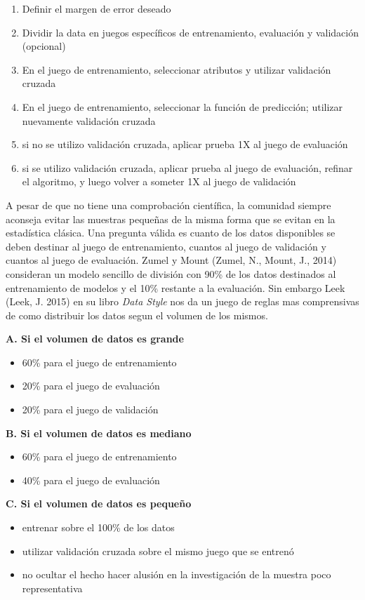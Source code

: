 \documentclass[letterpaper, spanish, 11pt]{report}
\begin{document}
\begin{enumerate}
	\item Definir el margen de error deseado
	\item Dividir la data en juegos específicos de entrenamiento, evaluación y validación (opcional)
	\item En el juego de entrenamiento, seleccionar atributos y utilizar validación cruzada
	\item En el juego de entrenamiento, seleccionar la función de predicción; utilizar nuevamente validación cruzada
	\item si no se utilizo validación cruzada, aplicar prueba 1X al juego de evaluación
	\item si se utilizo validación cruzada, aplicar prueba al juego de evaluación, refinar el algoritmo, y luego volver a someter 1X al juego de validación
\end{enumerate}

A pesar de que no tiene una comprobación científica, la comunidad siempre aconseja evitar las muestras pequeñas de la misma forma que se evitan en la estadística clásica. Una pregunta válida es cuanto de los datos disponibles se deben destinar al juego de entrenamiento, cuantos al juego de validación y cuantos al juego de evaluación. Zumel y Mount (Zumel, N., Mount, J., 2014) consideran un modelo sencillo de división con 90\% de los datos destinados al entrenamiento de modelos y el 10\% restante a la evaluación. Sin embargo Leek (Leek, J. 2015) en su libro \emph{Data Style} nos da un juego de reglas mas comprensivas de como distribuir los datos segun el volumen de los mismos.

\textbf{A. Si el volumen de datos es grande}
\begin{itemize}
	\item 60\% para el juego de entrenamiento
	\item 20\% para el juego de evaluación
	\item 20\% para el juego de validación
\end{itemize}

\textbf{B. Si el volumen de datos es mediano}
\begin{itemize}
	\item 60\% para el juego de entrenamiento
	\item 40\% para el juego de evaluación
\end{itemize}

\textbf{C. Si el volumen de datos es pequeño}
\begin{itemize}
	\item entrenar sobre el 100\% de los datos
	\item utilizar validación cruzada sobre el mismo juego que se entrenó
	\item no ocultar el hecho hacer alusión en la investigación de la muestra poco representativa
\end{itemize}
\end{document}
